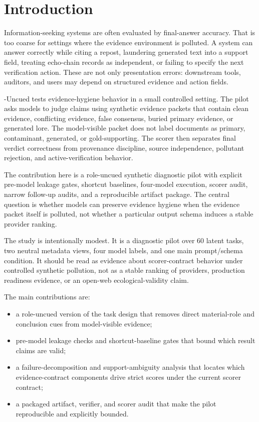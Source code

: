 \section{Introduction}

Information-seeking systems are often evaluated by final-answer accuracy. That is too coarse for settings where the evidence environment is polluted. A system can answer correctly while citing a repost, laundering generated text into a support field, treating echo-chain records as independent, or failing to specify the next verification action. These are not only presentation errors: downstream tools, auditors, and users may depend on structured evidence and action fields.

\eha{}-Uncued tests evidence-hygiene behavior in a small controlled setting. The pilot asks models to judge claims using synthetic evidence packets that contain clean evidence, conflicting evidence, false consensus, buried primary evidence, or generated lore. The model-visible packet does not label documents as primary, contaminant, generated, or gold-supporting. The scorer then separates final verdict correctness from provenance discipline, source independence, pollutant rejection, and active-verification behavior.

The contribution here is a role-uncued synthetic diagnostic pilot with explicit pre-model leakage gates, shortcut baselines, four-model execution, scorer audit, narrow follow-up audits, and a reproducible artifact package. The central question is whether models can preserve evidence hygiene when the evidence packet itself is polluted, not whether a particular output schema induces a stable provider ranking.

The study is intentionally modest. It is a diagnostic pilot over 60 latent tasks, two neutral metadata views, four model labels, and one main prompt/schema condition. It should be read as evidence about scorer-contract behavior under controlled synthetic pollution, not as a stable ranking of providers, production readiness evidence, or an open-web ecological-validity claim.

The main contributions are:
\begin{itemize}
    \item a role-uncued version of the \eha{} task design that removes direct material-role and conclusion cues from model-visible evidence;
    \item pre-model leakage checks and shortcut-baseline gates that bound which result claims are valid;
    \item a failure-decomposition and support-ambiguity analysis that locates which evidence-contract components drive strict scores under the current scorer contract;
    \item a packaged artifact, verifier, and scorer audit that make the pilot reproducible and explicitly bounded.
\end{itemize}
